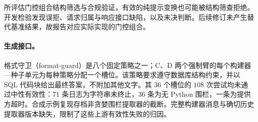 所评估门控组合结构筛选与合规验证，有效的纯提示变换也可能被结构筛查拒绝。开发检验发现误拒、请求归属与响应接口缺陷，以及未决判断。后续修订未产生替代基准结果，故报告对应实际实现的门控组合。

\paragraph{生成接口。}\label{app:extraction}
格式守卫（format-guard）是八个固定策略之一；C、D 两个强制臂的每个构建器—种子单元为每种策略分配一个槽位。该策略要求遵守数据库结构约束，并以 SQL 代码块给出最终答案，不附加其他文字。其 $36$ 个槽位的 $108$ 次尝试均未通过中性有效性：$71$ 条日志为字符串未终止，$36$ 条为无 Python 围栏，一条为提供方超时。合成示例复现存档非贪婪围栏提取器的截断。完整构建器消息与确切历史提取器版本缺失，限制了这些上游有效性失败的归因。
